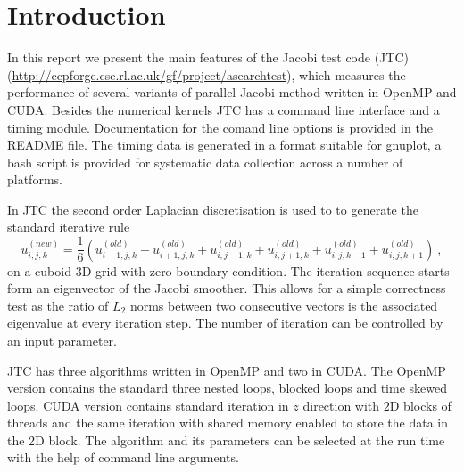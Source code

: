 \documentclass[a4paper,12pt]{article}
\begin{document}







\section{Introduction}

In this report we present the main features of the Jacobi test code
(JTC) (\url{http://ccpforge.cse.rl.ac.uk/gf/project/asearchtest}), which
measures the performance of several variants of parallel Jacobi
method written in OpenMP and CUDA. Besides
the numerical kernels JTC has a  command line interface and a
timing module. Documentation for the comand line options is provided
in the README file. The timing data is generated in a format suitable
for gnuplot, a bash script is provided for systematic data collection
across a number of platforms.

In JTC the second order Laplacian
discretisation is used to to generate the standard iterative rule
\begin{equation}
u^{(new)}_{i,j,k}=\frac{1}{6}(u^{(old)}_{i-1,j,k}+u^{(old)}_{i+1,j,k}+u^{(old)}_{i,j-1,k}+u^{(old)}_{i,j+1,k}+u^{(old)}_{i,j,k-1}+u^{(old)}_{i,j,k+1})
\ ,
\end{equation} 
on a cuboid $3$D grid with zero boundary condition. 
The iteration sequence starts form an eigenvector of the
Jacobi smoother. This allows for a simple correctness test as the ratio
of $L_2$ norms between two consecutive vectors is the associated eigenvalue
 at every iteration step.  The number of iteration can be controlled by
an input parameter.
 
 JTC has three algorithms written in OpenMP
 and two in CUDA. The OpenMP version contains the standard three
 nested loops, blocked loops and time skewed loops.  CUDA version
 contains standard iteration in $z$ direction with $2$D blocks of
 threads and the same iteration with shared memory enabled to
 store the data in the 2D block. The algorithm and its parameters can
 be selected at the run time with the help of command line arguments.
\end{document}
